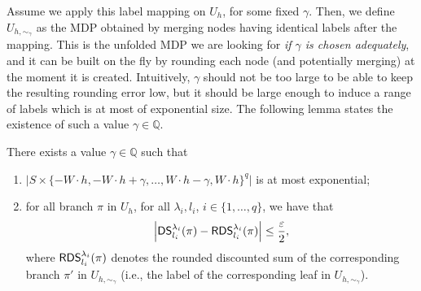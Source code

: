 \documentclass{llncs}
\newcommand{\states}{\ensuremath{S} }
\newcommand{\discSum}[1]{\ensuremath{{\sf DS}^{#1}} }
\newcommand{\discount}{\ensuremath{\lambda} }
\newcommand{\rat}{\ensuremath{\mathbb{Q}} }
\newcommand{\roundedDiscSum}[1]{\ensuremath{{\sf RDS}^{#1}} }
\begin{document}
Assume we apply this label mapping on $U_{h}$, for some fixed $\gamma$. Then, we define $U_{h, \sim_{\gamma}}$ as the MDP obtained by merging nodes having identical labels after the mapping. This is the unfolded MDP we are looking for \textit{if $\gamma$ is chosen adequately}, and it can be built on the fly by rounding each node (and potentially merging) at the moment it is created. Intuitively, $\gamma$ should not be too large to be able to keep the resulting rounding error low, but it should be large enough to induce a range of labels which is at most of exponential size. The following lemma states the existence of such a value $\gamma \in \rat$.

\begin{lemma}
\label{lem:ds_rounding}
There exists a value $\gamma \in \rat$ such that
\begin{enumerate}
\item $\big\vert \states \times \{-W \cdot h, -W\cdot h + \gamma, \ldots{}, W\cdot h - \gamma, W \cdot h\}^{q}\big\vert$ is at most exponential;
\item for all branch $\pi$ in $U_{h}$, for all $\discount_{i}, l_{i}$, $i \in \{1, \ldots{}, q\}$, we have that
\begin{equation*}
\left\vert \discSum{\discount_{i}}_{l_{i}}(\pi) - \roundedDiscSum{\discount_{i}}_{l_{i}}(\pi) \right\vert \leq \dfrac{\varepsilon}{2},
\end{equation*}
where $\roundedDiscSum{\discount_{i}}_{l_{i}}(\pi)$ denotes the rounded discounted sum of the corresponding branch $\pi'$ in $U_{h,\sim_{\gamma}}$ (i.e., the label of the corresponding leaf in $U_{h,\sim_{\gamma}}$).
\end{enumerate}
\end{lemma} 
\end{document}
